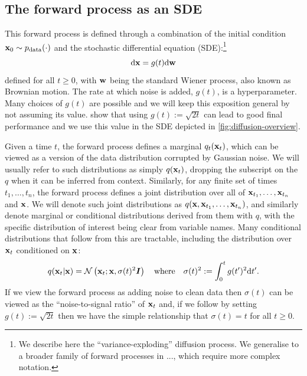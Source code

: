 \subsection{The forward process as an SDE} \label{sec:diffusion-forward-sde}
This forward process is defined through a combination of the initial condition ${\mathbf{x}}_0 \sim p_{\rm{data}}(\cdot)$ and the stochastic differential equation (SDE):\footnote{We describe here the ``variance-exploding'' diffusion process. We generalise to a broader family of forward processes in ..., which require more complex notation.}
\begin{equation} \label{eq:forward-diffusion}
    \mathrm{d}{\mathbf{x}} = g(t) \mathrm{d}{\mathbf{w}}
\end{equation}
defined for all $t \geq 0$, with ${\mathbf{w}}$ being the standard Wiener process, also known as Brownian motion. The rate at which noise is added, $g(t)$, is a hyperparameter. Many choices of $g(t)$ are possible and we will keep this exposition general by not assuming its value. \citet{karras2022elucidating} show that using $g(t) := \sqrt{2t}$ can lead to good final performance and we use this value in the SDE depicted in \cref{fig:diffusion-overview}.

Given a time $t$, the forward process defines a marginal $q_t({\mathbf{x}}_t)$, which can be viewed as a version of the data distribution corrupted by Gaussian noise. We will usually refer to such distributions as simply $q({\mathbf{x}}_t)$, dropping the subscript on the $q$ when it can be inferred from context. Similarly, for any finite set of times $t_1,\ldots,t_n$, the forward process defines a joint distribution over all of ${\mathbf{x}}_{t_1},\ldots,{\mathbf{x}}_{t_n}$ and ${\mathbf{x}}$. We will denote such joint distributions as $q({\mathbf{x}},{\mathbf{x}}_{t_1},\ldots,{\mathbf{x}}_{t_n})$, and similarly denote marginal or conditional distributions derived from them with $q$, with the specific distribution of interest being clear from variable names. Many conditional distributions that follow from this are tractable, including the distribution over ${\mathbf{x}}_t$ conditioned on ${\mathbf{x}}$:
\begin{equation}
    q({\mathbf{x}}_t|{\mathbf{x}}) = {\mathcal{N}} \left( {\mathbf{x}}_t; {\mathbf{x}}, \sigma(t)^2 {\bm{I}} \right) \quad \text{where} \quad \sigma(t)^2 := \int_0^t g(t')^2 \mathrm{d}t'.
\end{equation}
If we view the forward process as adding noise to clean data then $\sigma(t)$ can be viewed as the ``noise-to-signal ratio'' of ${\mathbf{x}}_t$ and, if we follow \citet{karras2022elucidating} by setting $g(t) := \sqrt{2t}$ then we have the simple relationship that $\sigma(t) = t$ for all $t\geq0$.

